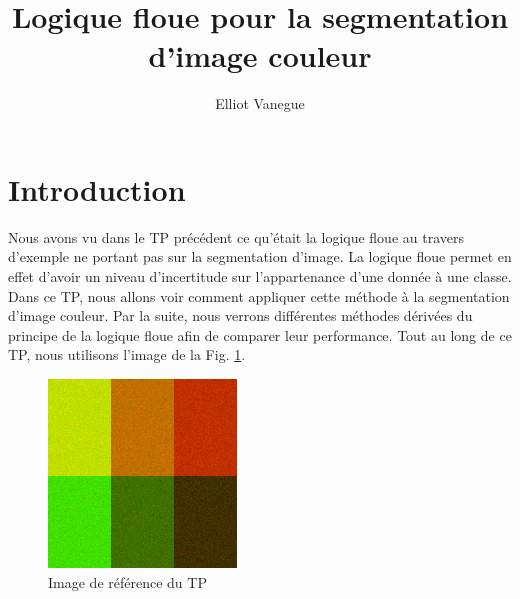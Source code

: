 \documentclass[a4paper,11pt]{article}
\title{Logique floue pour la segmentation d'image couleur}
\author{Elliot Vanegue}
\begin{document}
\maketitle


\section{Introduction}
Nous avons vu dans le TP précédent ce qu'était la logique floue au travers d'exemple ne portant pas 
sur la segmentation d'image. La logique floue permet en effet d'avoir un niveau d'incertitude sur 
l'appartenance d'une donnée à une classe. Dans ce TP, nous allons voir comment appliquer cette méthode
à la segmentation d'image couleur. Par la suite, nous verrons différentes méthodes dérivées du 
principe de la logique floue afin de comparer leur performance. Tout au long de ce TP, nous utilisons
l'image de la Fig. \ref{fig:reference}.

\begin{figure}[!h]
  \begin{center}
    \includegraphics[width=5cm]{6_classes_RGB.png}
    \caption{Image de référence du TP}
    \label{fig:reference}
  \end{center}
\end{figure}
\end{document}
